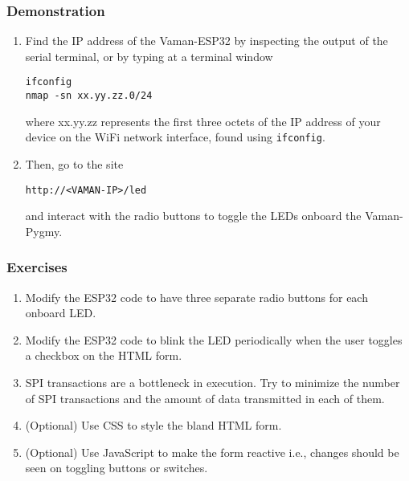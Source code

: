 \subsubsection{Demonstration}
\begin{enumerate}
    \item Find the IP address of the Vaman-ESP32 by inspecting the output of the
    serial terminal, or by typing at a terminal window
    \begin{lstlisting}
ifconfig
nmap -sn xx.yy.zz.0/24
    \end{lstlisting}
    where xx.yy.zz represents the first three octets of the IP address of your
    device on the WiFi network interface, found using \texttt{ifconfig}.
    \item Then, go to the site
    \begin{lstlisting}
http://<VAMAN-IP>/led
    \end{lstlisting}
    and interact with the radio buttons to toggle the LEDs onboard the
    Vaman-Pygmy. 
\end{enumerate}

\subsubsection{Exercises}
\begin{enumerate}
    \item Modify the ESP32 code to have three separate radio buttons for each
    onboard LED.
    \item Modify the ESP32 code to blink the LED periodically when the user
    toggles a checkbox on the HTML form.
    \item SPI transactions are a bottleneck in execution. Try to minimize the
    number of SPI transactions and the amount of data transmitted in each of
    them.
    \item (Optional) Use CSS to style the bland HTML form.
    \item (Optional) Use JavaScript to make the form reactive i.e., changes
    should be seen on toggling buttons or switches.
\end{enumerate}